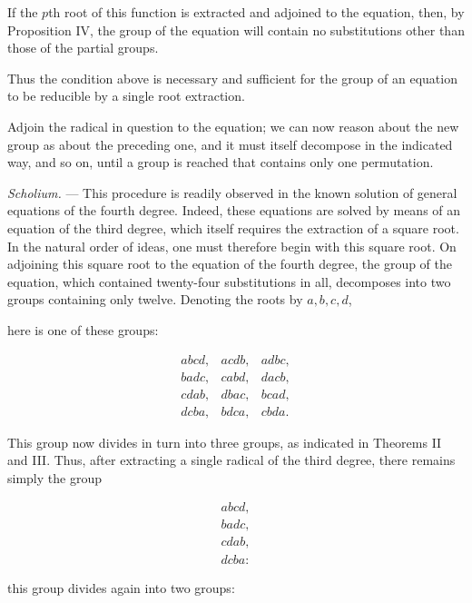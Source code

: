 If the $p$th root of this function is extracted and adjoined to the equation,
then, by Proposition IV, the group of the equation will contain no substitutions
other than those of the partial groups.

Thus the condition above is necessary and sufficient for the group of an
equation to be reducible by a single root extraction.

Adjoin the radical in question to the equation; we can now reason about the new
group as about the preceding one, and it must itself decompose in the indicated
way, and so on, until a group is reached that contains only one permutation.

\emph{Scholium.} --- This procedure is readily observed in the known solution of
general equations of the fourth degree. Indeed, these equations are solved by
means of an equation of the third degree, which itself requires the extraction
of a square root. In the natural order of ideas, one must therefore begin with
this square root. On adjoining this square root to the equation of the fourth
degree, the group of the equation, which contained twenty-four substitutions
in all, decomposes into two groups containing only twelve. Denoting the roots
by $a,b,c,d$,


here is one of these groups:

\[
\begin{array}{ccc}
  abcd, & acdb, & adbc,  \\
  badc, & cabd, & dacb,  \\
  cdab, & dbac, & bcad,  \\
  dcba, & bdca, & cbda.
\end{array}
\]

This group now divides in turn into three groups, as indicated in Theorems II
and III. Thus, after extracting a single radical of the third degree, there
remains simply the group

\[
\begin{array}{l}
  abcd,  \\
  badc,  \\
  cdab,  \\
  dcba:
\end{array}
\]

this group divides again into two groups:

